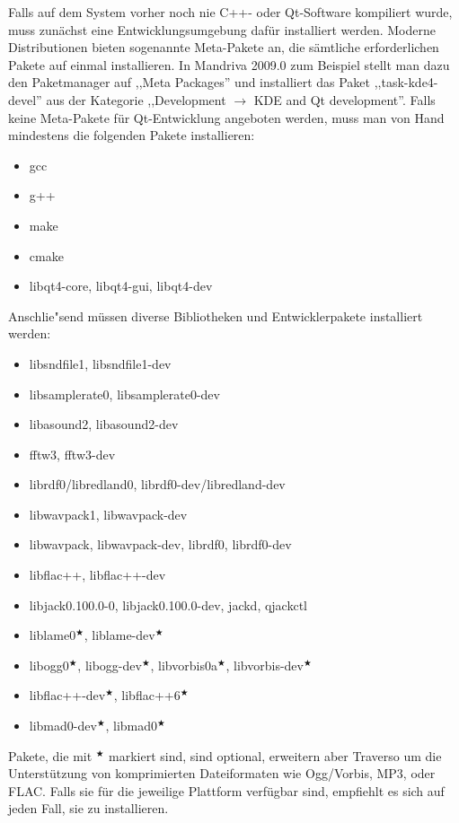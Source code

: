Falls auf dem System vorher noch nie C++- oder Qt-Software kompiliert wurde, muss zunächst eine Entwicklungsumgebung dafür installiert werden. Moderne Distributionen bieten sogenannte Meta-Pakete an, die sämtliche erforderlichen Pakete auf einmal installieren. In Mandriva 2009.0 zum Beispiel stellt man dazu den Paketmanager auf ,,Meta Packages'' und installiert das Paket ,,task-kde4-devel'' aus der Kategorie ,,Development $\rightarrow$ KDE and Qt development''. Falls keine Meta-Pakete für Qt-Entwicklung angeboten werden, muss man von Hand mindestens die folgenden Pakete installieren:

\begin{itemize}
  \item gcc
  \item g++
  \item make
  \item cmake
  \item libqt4-core, libqt4-gui, libqt4-dev
\end{itemize}

Anschlie"send müssen diverse Bibliotheken und Entwicklerpakete installiert werden:

\begin{itemize}
 \item libsndfile1, libsndfile1-dev
 \item libsamplerate0, libsamplerate0-dev
 \item libasound2, libasound2-dev
 \item fftw3, fftw3-dev
 \item librdf0/libredland0, librdf0-dev/libredland-dev
 \item libwavpack1, libwavpack-dev
 \item libwavpack, libwavpack-dev, librdf0, librdf0-dev
 \item libflac++, libflac++-dev
 \item libjack0.100.0-0, libjack0.100.0-dev, jackd, qjackctl
 \item liblame0$^\bigstar$, liblame-dev$^\bigstar$
 \item libogg0$^\bigstar$, libogg-dev$^\bigstar$, libvorbis0a$^\bigstar$, libvorbis-dev$^\bigstar$
 \item libflac++-dev$^\bigstar$, libflac++6$^\bigstar$
 \item libmad0-dev$^\bigstar$, libmad0$^\bigstar$
\end{itemize}

Pakete, die mit $^\bigstar$ markiert sind, sind optional, erweitern aber Traverso um die Unterstützung von komprimierten Dateiformaten wie Ogg/Vorbis, MP3, oder FLAC. Falls sie für die jeweilige Plattform verfügbar sind, empfiehlt es sich auf jeden Fall, sie zu installieren. 

